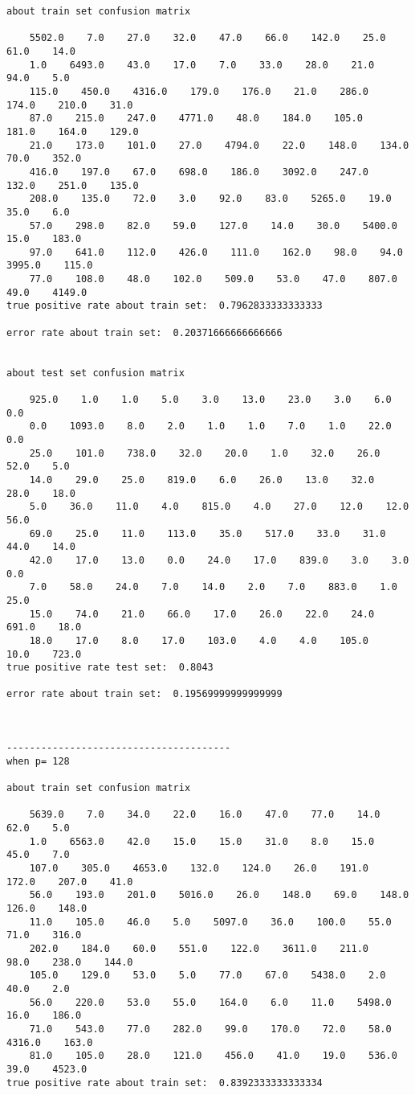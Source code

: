 \documentclass[11pt]{article}
\begin{document}
\begin{Verbatim}[commandchars=\\\{\}]
about train set confusion matrix

    5502.0    7.0    27.0    32.0    47.0    66.0    142.0    25.0    61.0    14.0
    1.0    6493.0    43.0    17.0    7.0    33.0    28.0    21.0    94.0    5.0
    115.0    450.0    4316.0    179.0    176.0    21.0    286.0    174.0    210.0    31.0
    87.0    215.0    247.0    4771.0    48.0    184.0    105.0    181.0    164.0    129.0
    21.0    173.0    101.0    27.0    4794.0    22.0    148.0    134.0    70.0    352.0
    416.0    197.0    67.0    698.0    186.0    3092.0    247.0    132.0    251.0    135.0
    208.0    135.0    72.0    3.0    92.0    83.0    5265.0    19.0    35.0    6.0
    57.0    298.0    82.0    59.0    127.0    14.0    30.0    5400.0    15.0    183.0
    97.0    641.0    112.0    426.0    111.0    162.0    98.0    94.0    3995.0    115.0
    77.0    108.0    48.0    102.0    509.0    53.0    47.0    807.0    49.0    4149.0
true positive rate about train set:  0.7962833333333333

error rate about train set:  0.20371666666666666


about test set confusion matrix

    925.0    1.0    1.0    5.0    3.0    13.0    23.0    3.0    6.0    0.0
    0.0    1093.0    8.0    2.0    1.0    1.0    7.0    1.0    22.0    0.0
    25.0    101.0    738.0    32.0    20.0    1.0    32.0    26.0    52.0    5.0
    14.0    29.0    25.0    819.0    6.0    26.0    13.0    32.0    28.0    18.0
    5.0    36.0    11.0    4.0    815.0    4.0    27.0    12.0    12.0    56.0
    69.0    25.0    11.0    113.0    35.0    517.0    33.0    31.0    44.0    14.0
    42.0    17.0    13.0    0.0    24.0    17.0    839.0    3.0    3.0    0.0
    7.0    58.0    24.0    7.0    14.0    2.0    7.0    883.0    1.0    25.0
    15.0    74.0    21.0    66.0    17.0    26.0    22.0    24.0    691.0    18.0
    18.0    17.0    8.0    17.0    103.0    4.0    4.0    105.0    10.0    723.0
true positive rate test set:  0.8043

error rate about train set:  0.19569999999999999



---------------------------------------
when p= 128

about train set confusion matrix

    5639.0    7.0    34.0    22.0    16.0    47.0    77.0    14.0    62.0    5.0
    1.0    6563.0    42.0    15.0    15.0    31.0    8.0    15.0    45.0    7.0
    107.0    305.0    4653.0    132.0    124.0    26.0    191.0    172.0    207.0    41.0
    56.0    193.0    201.0    5016.0    26.0    148.0    69.0    148.0    126.0    148.0
    11.0    105.0    46.0    5.0    5097.0    36.0    100.0    55.0    71.0    316.0
    202.0    184.0    60.0    551.0    122.0    3611.0    211.0    98.0    238.0    144.0
    105.0    129.0    53.0    5.0    77.0    67.0    5438.0    2.0    40.0    2.0
    56.0    220.0    53.0    55.0    164.0    6.0    11.0    5498.0    16.0    186.0
    71.0    543.0    77.0    282.0    99.0    170.0    72.0    58.0    4316.0    163.0
    81.0    105.0    28.0    121.0    456.0    41.0    19.0    536.0    39.0    4523.0
true positive rate about train set:  0.8392333333333334


\end{Verbatim}
\end{document}
